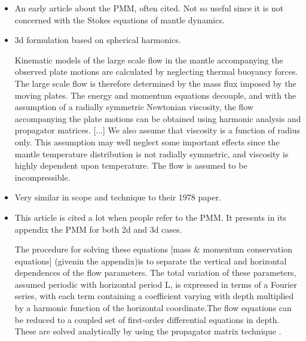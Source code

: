 \begin{itemize}


\item {}

An early article about the PMM, often cited. Not 
so useful since it is not concerned with the Stokes equations
of mantle dynamics.

\item {}

3d formulation based on spherical harmonics. 

\begin{displayquote}
{\color{darkgray}
Kinematic models of the large scale flow in the mantle accompanying the observed
plate motions are calculated by neglecting thermal buoyancy forces. 
The large scale flow
is therefore determined by the mass flux imposed by the moving plates. The energy and
momentum equations decouple, and with the assumption of a radially symmetric 
Newtonian viscosity, the flow accompanying the plate motions can be obtained using 
harmonic analysis and propagator matrices.
[...]
We also assume that viscosity
is a function of radius only. This assumption may well neglect some 
important effects since the mantle temperature distribution is not 
radially symmetric, and viscosity is highly dependent upon temperature. 
The flow is assumed to be incompressible.
}
\end{displayquote}

\item {}

Very similar in scope and technique to their 1978 paper. 

\item {}

This article is cited a lot when people refer to the PMM. 
It presents in its appendix the PMM for both 2d and 3d cases.

\begin{displayquote}
{\color{darkgray}
The procedure for solving these equations [mass \& momentum
conservation equations] (givenin the appendix)is to separate 
the vertical and horizontal dependences
of the flow parameters. The total variation of these parameters, 
assumed periodic with horizontal period L, is expressed
in terms of a Fourier series, with each term containing a 
coefficient varying with depth multiplied by a harmonic function
of the horizontal coordinate.The flow equations can be reduced 
to a coupled set of first-order differential equations in
depth. These are solved analytically by using the propagator
matrix technique \cite{giba66}.
}
\end{displayquote}


\end{itemize}

